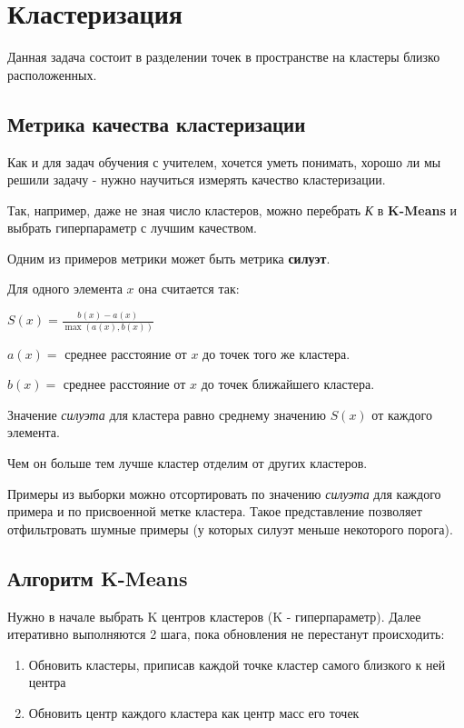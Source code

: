  \section{Кластеризация}
 
Данная задача состоит в разделении точек в пространстве на кластеры близко расположенных.

\subsection{Метрика качества кластеризации}

Как и для задач обучения с учителем, хочется уметь понимать, хорошо ли мы решили задачу - нужно научиться измерять качество кластеризации. 

Так, например, даже не зная число кластеров, можно
перебрать \textit{К} в \textbf{K-Means} и выбрать гиперпараметр с лучшим качеством.

Одним из примеров метрики может быть метрика \textbf{силуэт}.

Для одного элемента $x$ она считается так:

$S(x)=\frac{b(x)-a(x)}{\max (a(x), b(x))}$

$a(x)=$ среднее расстояние от $x$ до точек того же кластера.

$b(x)=$ среднее расстояние от $x$ до точек ближайшего кластера.

Значение \textit{силуэта} для кластера равно среднему значению $S(x)$ от каждого элемента.

Чем он больше тем лучше кластер отделим от других кластеров.

Примеры из выборки можно отсортировать по значению \textit{силуэта} для каждого примера и по
присвоенной метке кластера. Такое представление позволяет отфильтровать шумные примеры (у
которых силуэт меньше некоторого порога).
 
 \subsection{Алгоритм K-Means}
 
Нужно в начале выбрать K центров кластеров (K - гиперпараметр). Далее итеративно выполняются 2 шага, пока обновления не перестанут происходить:
\begin{enumerate}
    \item Обновить кластеры, приписав каждой точке кластер самого близкого к ней центра
    \item Обновить центр каждого кластера как центр масс его точек
\end{enumerate}

